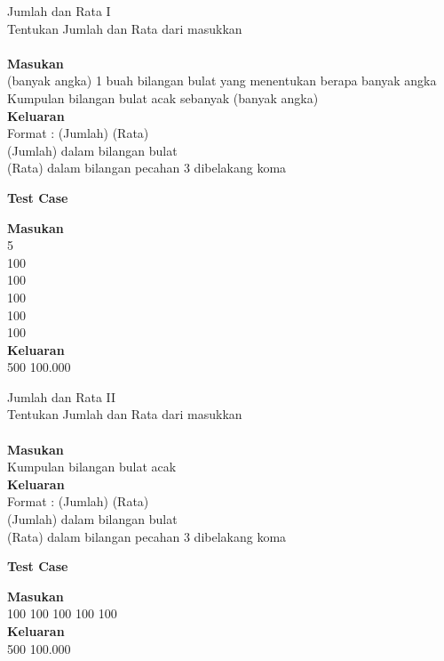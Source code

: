 \newpage
\begin{permasalahan}{Jumlah dan Rata I}\\
\label{prob:BanyakDiriku}
	 Tentukan Jumlah dan Rata dari masukkan\\\\
	\textbf{Masukan}\\
	(banyak angka) 1 buah bilangan bulat yang menentukan berapa banyak angka \\
	Kumpulan bilangan bulat acak sebanyak (banyak angka) \\
	\textbf{Keluaran}\\
	Format : (Jumlah) (Rata)\\
	(Jumlah) dalam bilangan bulat\\
	(Rata)  dalam bilangan pecahan 3 dibelakang koma\\
	\begin{center}
	\textbf{Test Case}\\
	\end{center}
	\textbf{Masukan}\\
	5\\
	100\\
	100\\
	100\\
	100\\
	100\\
	\textbf{Keluaran} \\
		500 100.000
\end{permasalahan}


\newpage
\begin{permasalahan}{Jumlah dan Rata II}\\
\label{prob:BanyakDiriku2}
	  Tentukan Jumlah dan Rata dari masukkan\\\\
	\textbf{Masukan}\\
	Kumpulan bilangan bulat acak \\
	\textbf{Keluaran}\\
	Format : (Jumlah) (Rata)\\
	(Jumlah) dalam bilangan bulat\\
	(Rata)  dalam bilangan pecahan 3 dibelakang koma
	\begin{center}
	\textbf{Test Case}\\
	\end{center}
	\textbf{Masukan}\\
	100 100 100 100 100 \\
	\textbf{Keluaran}\\
		500 100.000\\
\end{permasalahan}


